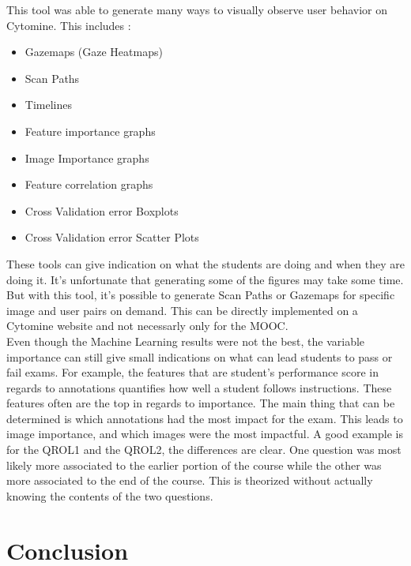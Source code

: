 \documentclass[a4paper,11pt]{report}
\numberwithin{figure}{section} %
\begin{document}
        This tool was able to generate many ways to visually observe user behavior on Cytomine. This includes :
        \begin{itemize}
            \item[\textbullet] Gazemaps (Gaze Heatmaps)
            \item[\textbullet] Scan Paths
            \item[\textbullet] Timelines
            \item[\textbullet] Feature importance graphs
            \item[\textbullet] Image Importance graphs
            \item[\textbullet] Feature correlation graphs
            \item[\textbullet] Cross Validation error Boxplots
            \item[\textbullet] Cross Validation error Scatter Plots
        \end{itemize}

        These tools can give indication on what the students are doing and when they are doing it.
        It's unfortunate that generating some of the figures may take some time.
        But with this tool, it's possible to generate Scan Paths or Gazemaps for specific image and user pairs on demand.
        This can be directly implemented on a Cytomine website and not necessarly only for the MOOC.\\


        Even though the Machine Learning results were not the best, the variable importance can still give small indications on what can lead students to pass or fail exams.
        For example, the features that are student's performance score in regards to annotations quantifies how well a student follows instructions.
        These features often are the top in regards to importance.
        The main thing that can be determined is which annotations had the most impact for the exam.
        This leads to image importance, and which images were the most impactful.
        A good example is for the QROL1 and the QROL2, the differences are clear.
        One question was most likely more associated to the earlier portion of the course while the other was more associated to the end of the course.
        This is theorized without actually knowing the contents of the two questions.



\section{Conclusion}
\end{document}
